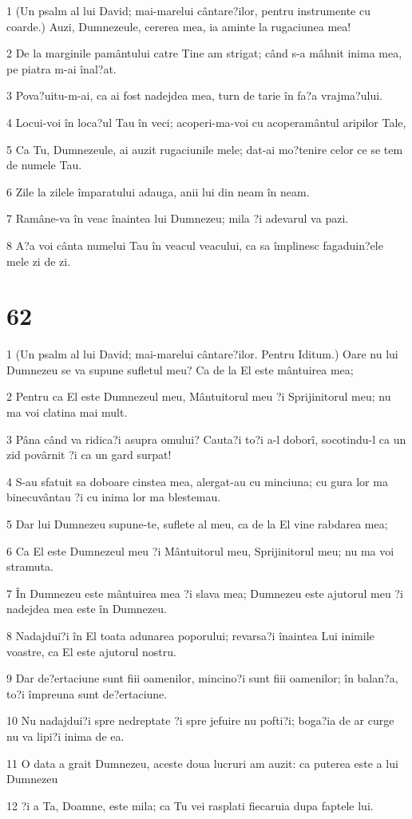 \par 1 (Un psalm al lui David; mai-marelui cântare?ilor, pentru instrumente cu coarde.) Auzi, Dumnezeule, cererea mea, ia aminte la rugaciunea mea!
\par 2 De la marginile pamântului catre Tine am strigat; când s-a mâhnit inima mea, pe piatra m-ai înal?at.
\par 3 Pova?uitu-m-ai, ca ai fost nadejdea mea, turn de tarie în fa?a vrajma?ului.
\par 4 Locui-voi în loca?ul Tau în veci; acoperi-ma-voi cu acoperamântul aripilor Tale,
\par 5 Ca Tu, Dumnezeule, ai auzit rugaciunile mele; dat-ai mo?tenire celor ce se tem de numele Tau.
\par 6 Zile la zilele împaratului adauga, anii lui din neam în neam.
\par 7 Ramâne-va în veac înaintea lui Dumnezeu; mila ?i adevarul va pazi.
\par 8 A?a voi cânta numelui Tau în veacul veacului, ca sa împlinesc fagaduin?ele mele zi de zi.

\chapter{62}

\par 1 (Un psalm al lui David; mai-marelui cântare?ilor. Pentru Iditum.) Oare nu lui Dumnezeu se va supune sufletul meu? Ca de la El este mântuirea mea;
\par 2 Pentru ca El este Dumnezeul meu, Mântuitorul meu ?i Sprijinitorul meu; nu ma voi clatina mai mult.
\par 3 Pâna când va ridica?i asupra omului? Cauta?i to?i a-l doborî, socotindu-l ca un zid povârnit ?i ca un gard surpat!
\par 4 S-au sfatuit sa doboare cinstea mea, alergat-au cu minciuna; cu gura lor ma binecuvântau ?i cu inima lor ma blestemau.
\par 5 Dar lui Dumnezeu supune-te, suflete al meu, ca de la El vine rabdarea mea;
\par 6 Ca El este Dumnezeul meu ?i Mântuitorul meu, Sprijinitorul meu; nu ma voi stramuta.
\par 7 În Dumnezeu este mântuirea mea ?i slava mea; Dumnezeu este ajutorul meu ?i nadejdea mea este în Dumnezeu.
\par 8 Nadajdui?i în El toata adunarea poporului; revarsa?i înaintea Lui inimile voastre, ca El este ajutorul nostru.
\par 9 Dar de?ertaciune sunt fiii oamenilor, mincino?i sunt fiii oamenilor; în balan?a, to?i împreuna sunt de?ertaciune.
\par 10 Nu nadajdui?i spre nedreptate ?i spre jefuire nu pofti?i; boga?ia de ar curge nu va lipi?i inima de ea.
\par 11 O data a grait Dumnezeu, aceste doua lucruri am auzit: ca puterea este a lui Dumnezeu
\par 12 ?i a Ta, Doamne, este mila; ca Tu vei rasplati fiecaruia dupa faptele lui.

